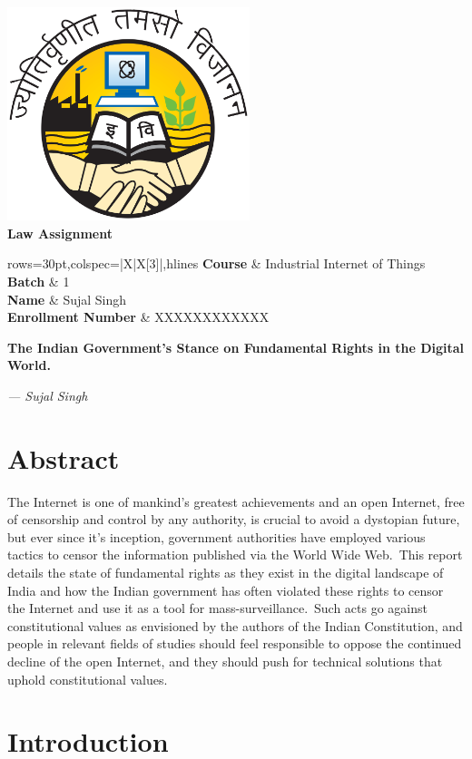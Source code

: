\documentclass[11pt,a4paper,oneside]{scrarticle}
\renewcommand*{\maketitle}{
    \pagenumbering{gobble}
    \begin{center}
        \vspace*{8em}
        \includegraphics[width=200pt]{../../tools/pdf/template/logo} \\[40pt]
        \textbf{\Huge Law Assignment} \\[40pt]
        \begin{table}[htb]
            \label{tab:name-slip}
            \begin{tblr}{rows={30pt},colspec={|X|X[3]|},hlines}
                \textbf{Course}            & Industrial Internet of Things \\
                \textbf{Batch}             & 1                             \\
                \textbf{Name}              & Sujal Singh                   \\
                \textbf{Enrollment Number} & XXXXXXXXXXXX                  \\
            \end{tblr}
        \end{table}
    \end{center}
    \newpage
    \pagenumbering{arabic}
}
\begin{document}
    \maketitle

    \begin{center}
        \textbf{\LARGE The Indian Government's Stance on Fundamental Rights in the Digital World.}
        \\[10pt]
    \end{center}
    \begin{flushright}
        \textit{--- Sujal Singh} \\[20pt]
    \end{flushright}


    \section*{Abstract}\label{sec:abstract}
    The Internet is one of mankind's greatest achievements and an open Internet, free of censorship and control by any
    authority, is crucial to avoid a dystopian future, but ever since it's inception, government authorities have
    employed various tactics to censor the information published via the World Wide Web.\ This report details the
    state of fundamental rights as they exist in the digital landscape of India and how the Indian government has often
    violated these rights to censor the Internet and use it as a tool for mass-surveillance.\ Such acts go against
    constitutional values as envisioned by the authors of the Indian Constitution, and people in relevant fields of
    studies should feel responsible to oppose the continued decline of the open Internet, and they should push for
    technical solutions that uphold constitutional values.




    \section{Introduction}\label{sec:introduction}
\end{document}
